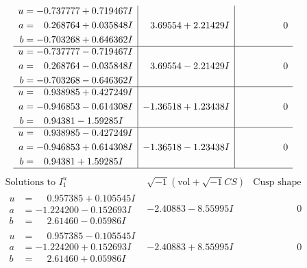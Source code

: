 \documentclass[1p]{elsarticle_modified}
\theoremstyle{definition}
\newcommand{\I}{\sqrt{-1}}
\begin{document}
$$\begin{array}{c|c|c}
\begin{aligned}
u &= -0.737777 + 0.719467 I \\
a &= \phantom{-}0.268764 + 0.035848 I \\
b &= -0.703268 + 0.646362 I\end{aligned}
 & \phantom{-}3.69554 + 2.21429 I & \phantom{-0.000000 } 0 \\ \hline\begin{aligned}
u &= -0.737777 - 0.719467 I \\
a &= \phantom{-}0.268764 - 0.035848 I \\
b &= -0.703268 - 0.646362 I\end{aligned}
 & \phantom{-}3.69554 - 2.21429 I & \phantom{-0.000000 } 0 \\ \hline\begin{aligned}
u &= \phantom{-}0.938985 + 0.427249 I \\
a &= -0.946853 - 0.614308 I \\
b &= \phantom{-}0.94381 - 1.59285 I\end{aligned}
 & -1.36518 + 1.23438 I & \phantom{-0.000000 } 0 \\ \hline\begin{aligned}
u &= \phantom{-}0.938985 - 0.427249 I \\
a &= -0.946853 + 0.614308 I \\
b &= \phantom{-}0.94381 + 1.59285 I\end{aligned}
 & -1.36518 - 1.23438 I & \phantom{-0.000000 } 0\\
 \hline 
 \end{array}$$\newpage$$\begin{array}{c|c|c}  
\text{Solutions to }I^u_{1}& \I (\text{vol} + \sqrt{-1}CS) & \text{Cusp shape}\\
 \hline 
\begin{aligned}
u &= \phantom{-}0.957385 + 0.105545 I \\
a &= -1.224200 - 0.152693 I \\
b &= \phantom{-}2.61460 - 0.05986 I\end{aligned}
 & -2.40883 - 8.55995 I & \phantom{-0.000000 } 0 \\ \hline\begin{aligned}
u &= \phantom{-}0.957385 - 0.105545 I \\
a &= -1.224200 + 0.152693 I \\
b &= \phantom{-}2.61460 + 0.05986 I\end{aligned}
 & -2.40883 + 8.55995 I & \phantom{-0.000000 } 0 \\ \hline\begin{aligned}

\end{aligned}
\end{array}$$
\end{document}
